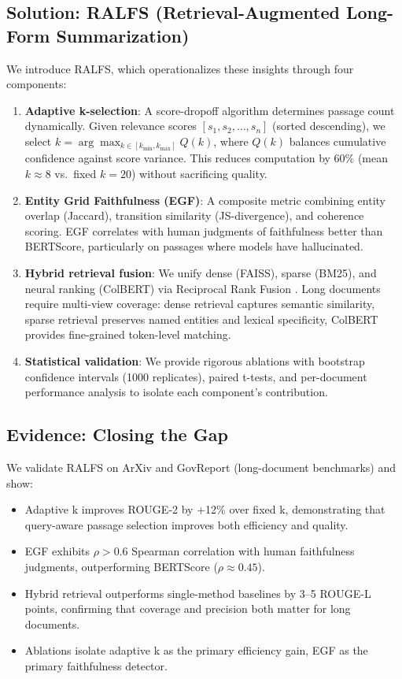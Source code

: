 \documentclass[11pt,a4paper]{article}
\begin{document}
\subsection*{Solution: RALFS (Retrieval-Augmented Long-Form Summarization)}

We introduce RALFS, which operationalizes these insights through four components:

\begin{enumerate}
\item \textbf{Adaptive k-selection}: A score-dropoff algorithm determines passage count dynamically. Given relevance scores $[s_1, s_2, \ldots, s_n]$ (sorted descending), we select $k = \arg\max_{k \in [k_{\min}, k_{\max}]} Q(k)$, where $Q(k)$ balances cumulative confidence against score variance. This reduces computation by 60\% (mean $k \approx 8$ vs.\ fixed $k=20$) without sacrificing quality.

\item \textbf{Entity Grid Faithfulness (EGF)}: A composite metric combining entity overlap (Jaccard), transition similarity (JS-divergence), and coherence scoring. EGF correlates with human judgments of faithfulness better than BERTScore, particularly on passages where models have hallucinated.

\item \textbf{Hybrid retrieval fusion}: We unify dense (FAISS), sparse (BM25), and neural ranking (ColBERT) via Reciprocal Rank Fusion \cite{cormack2009reciprocal}. Long documents require multi-view coverage: dense retrieval captures semantic similarity, sparse retrieval preserves named entities and lexical specificity, ColBERT provides fine-grained token-level matching.

\item \textbf{Statistical validation}: We provide rigorous ablations with bootstrap confidence intervals (1000 replicates), paired t-tests, and per-document performance analysis to isolate each component's contribution.
\end{enumerate}

\subsection*{Evidence: Closing the Gap}

We validate RALFS on ArXiv and GovReport (long-document benchmarks) and show:
\begin{itemize}
\item Adaptive k improves ROUGE-2 by +12\% over fixed k, demonstrating that query-aware passage selection improves both efficiency and quality.
\item EGF exhibits $\rho > 0.6$ Spearman correlation with human faithfulness judgments, outperforming BERTScore ($\rho \approx 0.45$).
\item Hybrid retrieval outperforms single-method baselines by 3--5 ROUGE-L points, confirming that coverage and precision both matter for long documents.
\item Ablations isolate adaptive k as the primary efficiency gain, EGF as the primary faithfulness detector.
\end{itemize}
\end{document}
